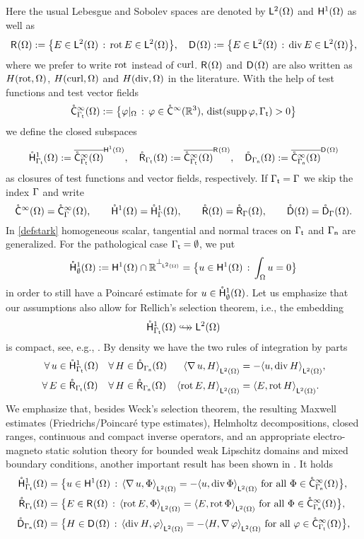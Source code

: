 \documentclass[a4paper]{amsart}
\renewcommand{\cic}{\mathring\csymbol^{\infty}}
\renewcommand{\hoc}{\mathring\hsymbol^{1}}
\newcommand{\hoces}{\hoc_{\emptyset}}
\newcommand{\hocesom}{\hoces(\om)}
\renewcommand{\rc}{\mathring\rsymbol}
\renewcommand{\dc}{\mathring\dsymbol}
\newcommand{\cptemb}{\hookto\hspace*{-0.85em}\hookto}
\begin{document}
Here the usual Lebesgue and Sobolev spaces are denoted by $\overset{}{\mathsf{L}}{}^{2}_{}(\Omega)$ and $\overset{}{\mathsf{H}}{}^{1}_{}(\Omega)$ as well as
\begin{align*}
\overset{}{\mathsf{R}}{}^{}_{}(\Omega):=\big\{E\in\overset{}{\mathsf{L}}{}^{2}_{}(\Omega)\,:\,\operatorname{rot} E\in\overset{}{\mathsf{L}}{}^{2}_{}(\Omega)\big\},\quad 
\overset{}{\mathsf{D}}{}^{}_{}(\Omega):=\big\{E\in\overset{}{\mathsf{L}}{}^{2}_{}(\Omega)\,:\,\operatorname{div} E\in\overset{}{\mathsf{L}}{}^{2}_{}(\Omega)\big\},
\end{align*}
where we prefer to write $\operatorname{rot}$ instead of $\operatorname{curl}$.
$\overset{}{\mathsf{R}}{}^{}_{}(\Omega)$ and $\overset{}{\mathsf{D}}{}^{}_{}(\Omega)$ are also written as $H(\operatorname{rot},\Omega)$, $H(\operatorname{curl},\Omega)$ 
and $H(\operatorname{div},\Omega)$ in the literature. With the help of test functions and test vector fields
$$\cicgatom:=\setb{\varphi|_\om}{\varphi\in\cic(\rt),\,\dist(\supp\varphi,\gat)>0}$$
we define the closed subspaces
\begin{align}
\mylabel{defstark}
\hocgatom:=\overline{\cicgatom}^{\hoom},\quad 
\rcgatom:=\overline{\cicgatom}^{\rom},\quad
\dcganom:=\overline{\cicganom}^{\dom}
\end{align}
as closures of test functions and vector fields, respectively. 
If $\Gamma_{\mathsf{t}}=\Gamma$ we skip the index $\Gamma$ and write
$$\cic(\om)=\cic_{\ga}(\om),\qquad
\hoc(\om)=\hoc_{\ga}(\om),\qquad
\rc(\om)=\rc_{\ga}(\om),\qquad
\dc(\om)=\dc_{\ga}(\om).$$
In \eqref{defstark} homogeneous scalar, tangential and normal traces 
on $\Gamma_{\mathsf{t}}$ and $\Gamma_{\mathsf{n}}$ are generalized.
For the pathological case $\Gamma_{\mathsf{t}}=\emptyset$, we put
$$\hocesom
:=\hoom\cap\reals^{\bot_{\ltom}}
=\setb{u\in\hoom}{\int_{\om}u=0}$$
in order to still have a Poincar\'e estimate for $u\in\hocesom$.
Let us emphasize that our assumptions also allow for Rellich's selection theorem, i.e., the embedding
\begin{align}
\mylabel{rellichst}
\hocgatom\cptemb\ltom
\end{align}
is compact, see, e.g., \cite[Theorem 4.8]{bauerpaulyschomburgmcpweaklip}. 
By density we have the two rules of integration by parts
\begin{align}
\mylabel{partintna}
\forall\,u&\in\hocgatom
&
\forall\,H&\in\dcganom
&
\scpltom{\na u}{H}&=-\scpltom{u}{\div H},\\
\mylabel{partintrot}
\forall\,E&\in\rcgatom
&
\forall\,H&\in\rcganom
&
\scpltom{\rot E}{H}&=\scpltom{E}{\rot H}.
\end{align}
We emphasize that,
besides Weck's selection theorem, the resulting Maxwell estimates (Friedrichs/Poincar\'e type estimates), 
Helmholtz decompositions, closed ranges, continuous and compact inverse operators,
and an appropriate electro-magneto static solution theory
for bounded weak Lipschitz domains and mixed boundary conditions,
another important result has been shown in \cite{bauerpaulyschomburgmcpweaklip}.
It holds
\begin{align}
\label{defschwach}
\begin{split}
\hocgatom&= 
\setb{u\in\hoom}{\scpltom{\na u}{\Phi}=-\scpltom{u}{\div\Phi}\text{ for all }\Phi\in\cicganom},\\
\rcgatom&
=\setb{E\in\rom}{\scpltom{\rot E}{\Phi}=\scpltom{E}{\rot\Phi}\text{ for all }\Phi\in\cicganom},\\
\dcganom&
=\setb{H\in\dom}{\scpltom{\div H}{\varphi}=-\scpltom{H}{\na\varphi}\text{ for all }\varphi\in\cicgatom},
\end{split}
\end{align}
\end{document}
